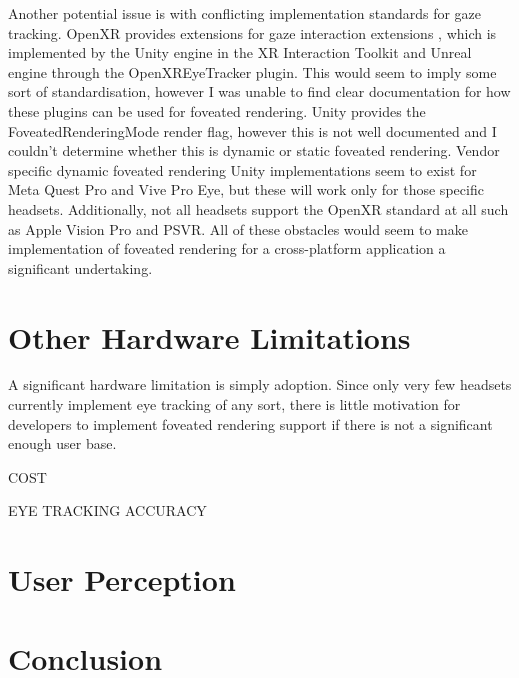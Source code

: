 \documentclass[a4paper,11pt]{article}
\begin{document}
Another potential issue is with conflicting implementation standards for gaze tracking. OpenXR provides extensions for gaze interaction extensions \cite{xr_gaze}, which is implemented by the Unity engine in the XR Interaction Toolkit \cite{xr_gaze_unity} and Unreal engine through the OpenXREyeTracker plugin\cite{xr_gaze_unreal}. This would seem to imply some sort of standardisation, however I was unable to find clear documentation for how these plugins can be used for foveated rendering. Unity provides the FoveatedRenderingMode render flag\cite{unity_fove}, however this is not well documented and I couldn't determine whether this is dynamic or static foveated rendering. Vendor specific dynamic foveated rendering Unity implementations seem to exist for Meta Quest Pro\cite{meta_unity} and Vive Pro Eye\cite{vive_unity}, but these will work only for those specific headsets. Additionally, not all headsets support the OpenXR standard at all such as Apple Vision Pro and PSVR\cite{openxr_conform}. All of these obstacles would seem to make implementation of foveated rendering for a cross-platform application a significant undertaking.

\section{Other Hardware Limitations}
A significant hardware limitation is simply adoption. Since only very few headsets currently implement eye tracking of any sort, there is little motivation for developers to implement foveated rendering support if there is not a significant enough user base.

COST

EYE TRACKING ACCURACY

\section{User Perception}

\section{Conclusion}

\printbibliography
\end{document}
